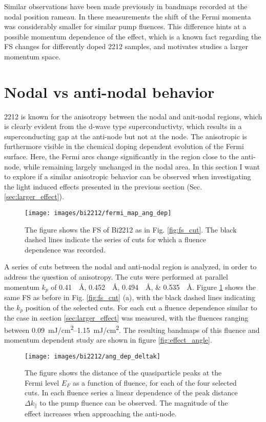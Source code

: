 Similar observations have been made previously in bandmaps recorded at the nodal position \cite{bibid} rameau.
In these measurements the shift of the Fermi momenta was considerably smaller for similar pump fluences.
This difference hints at a possible momentum dependence of the effect, which is a known fact regarding the FS changes for differently doped 2212 samples, and motivates studies a larger momentum space.

\section{Nodal vs anti-nodal behavior}
\label{sec:angle}

2212 is known for the anisotropy between the nodal and anit-nodal regions, which is clearly evident from the d-wave type superconductivty, which results in a superconducting gap at the anti-node but not at the node.
The anisotropic is furthermore visible in the chemical doping dependent evolution of the Fermi surface.
Here, the Fermi arcs change significantly in the region close to the anti-node, while remaining largely unchanged in the nodal area.
In this section I want to explore if a similar anisotropic behavior can be observed when investigating the light induced effects presented in the previous section (Sec. \ref{sec:larger_effect}).

\begin{figure}[t]
	\centering
	\texttt{[image: images/bi2212/fermi\_map\_ang\_dep]}
	\caption{The figure shows the FS of Bi2212 as in Fig. \ref{fig:fs_cut}. The black dashed lines indicate the series of cuts for which a fluence dependence was recorded.}
	\label{fig:fermimap_angdep}
\end{figure}

A series of cuts between the nodal and anti-nodal region is analyzed, in order to address the question of anisotropy.
The cuts were performed at parallel momentum $k_p$ of \qtylist{0.41;0.452;0.494;0.535}{\per\angstrom}.
Figure \ref{fig:fermimap_angdep} shows the same FS as before in Fig. \ref{fig:fs_cut} (a), with the black dashed lines indicating the $k_p$ position of the selected cuts.
For each cut a fluence dependence similar to the case in section \ref{sec:larger_effect} was measured, with the fluences ranging between \qtyrange{0.09}{1.15}{\milli\joule/\centi\meter\squared}.
The resulting bandmaps of this fluence and momentum dependent study are shown in figure \ref{fig:effect_angle}.

\begin{figure}[b!]
	\centering
	\texttt{[image: images/bi2212/ang\_dep\_deltak]}
	\caption{The figure shows the distance of the quasiparticle peaks at the Fermi level $E_F$ as a function of fluence, for each of the four selected cuts. In each fluence series a linear dependence of the peak distance $\Delta k_\parallel$ to the pump fluence can be observed. The magnitude of the effect increases when approaching the anti-node.}
	\label{fig:angdep_deltak}
\end{figure}


